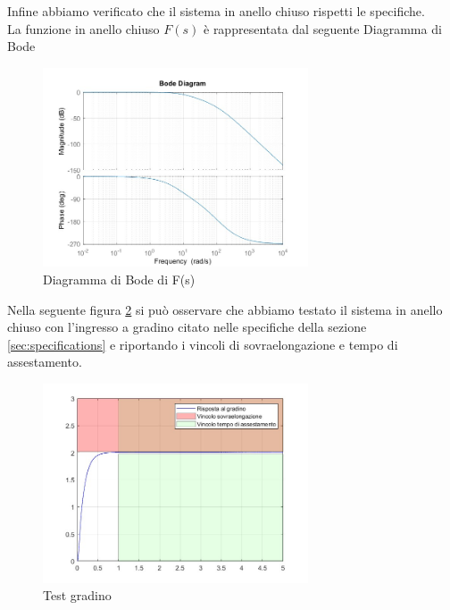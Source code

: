 \documentclass[a4paper, 11pt]{article}
\begin{document}
Infine abbiamo verificato che il sistema in anello chiuso rispetti le specifiche.\\
La funzione in anello chiuso $F(s)$ è rappresentata dal seguente Diagramma di Bode

\begin{figure}[H]
    \centering
    \includegraphics[width=0.70\textwidth]{immagini/F_s.jpg}
    \caption{Diagramma di Bode di F(s)}
    \label{fig:F_s}
\end{figure}

Nella seguente figura \ref{fig:test_gradino} si può osservare che abbiamo testato il sistema in anello chiuso con l'ingresso a gradino citato nelle specifiche della sezione \ref{sec:specifications} e riportando i vincoli di sovraelongazione e tempo di assestamento.

\begin{figure}[H]
    \centering
    \includegraphics[width=0.70\textwidth]{immagini/risposta_al_gradino_test_punto_3.jpg}
    \caption{Test gradino}
    \label{fig:test_gradino}
\end{figure}
   
\end{document}
